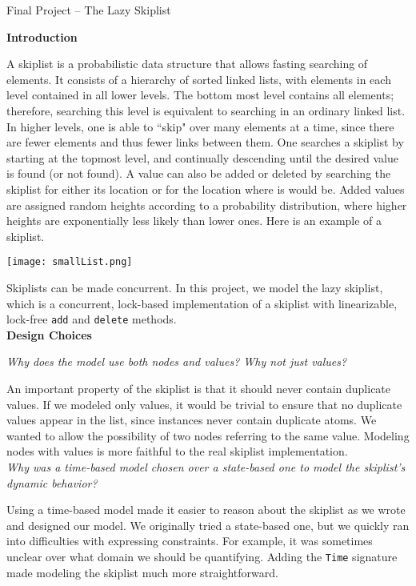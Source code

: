 \documentclass[12pt]{article}
\begin{document}
\begin{center}
Final Project -- The Lazy Skiplist
\end{center}

\noindent
\textbf{Introduction}

A skiplist is a probabilistic data structure that allows fasting searching of elements. It consists of a hierarchy of sorted linked lists, with elements in each level contained in all lower levels. The bottom most level contains all elements; therefore, searching this level is equivalent to searching in an ordinary linked list. In higher levels, one is able to ``skip" over many elements at a time, since there are fewer elements and thus fewer links between them. One searches a skiplist by starting at the topmost level, and continually descending until the desired value is found (or not found). A value can also be added or deleted by searching the skiplist for either its location or for the location where is would be. Added values are assigned random heights according to a probability distribution, where higher heights are exponentially less likely than lower ones. Here is an example of a skiplist.

\begin{center}
\texttt{[image: smallList.png]}
\end{center}

Skiplists can be made concurrent. In this project, we model the lazy skiplist, which is a concurrent, lock-based implementation of a skiplist with linearizable, lock-free \verb|add| and \verb|delete| methods. \\

\noindent
\textbf{Design Choices}

\noindent
\emph{Why does the model use both nodes and values? Why not just values?}

An important property of the skiplist is that it should never contain duplicate values. If we modeled only values, it would be trivial to ensure that no duplicate values appear in the list, since instances never contain duplicate atoms. We wanted to allow the possibility of two nodes referring to the same value. Modeling nodes with values is more faithful to the real skiplist implementation. \\

\noindent
\emph{Why was a time-based model chosen over a state-based one to model the skiplist's dynamic behavior?}

Using a time-based model made it easier to reason about the skiplist as we wrote and designed our model. We originally tried a state-based one, but we quickly ran into difficulties with expressing constraints. For example, it was sometimes unclear over what domain we should be quantifying. Adding the \verb|Time| signature made modeling the skiplist much more straightforward. \\
\end{document}
